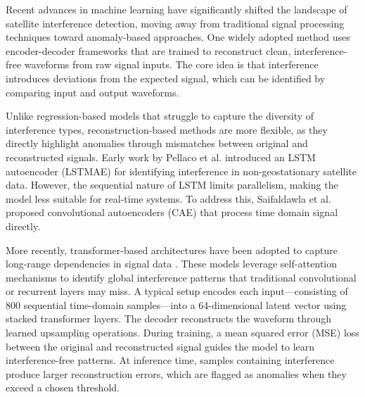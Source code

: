 \documentclass[conference]{IEEEtran}
\begin{document}

Recent advances in machine learning have significantly shifted the landscape of satellite interference detection, moving away from traditional signal processing techniques toward anomaly-based approaches. One widely adopted method uses encoder-decoder frameworks that are trained to reconstruct clean, interference-free waveforms from raw signal inputs. The core idea is that interference introduces deviations from the expected signal, which can be identified by comparing input and output waveforms.

Unlike regression-based models that struggle to capture the diversity of interference types, reconstruction-based methods are more flexible, as they directly highlight anomalies through mismatches between original and reconstructed signals. Early work by Pellaco et al. \cite{pellacoSpectrumPredictionInterference2019} introduced an LSTM autoencoder (LSTMAE) for identifying interference in non-geostationary satellite data. However, the sequential nature of LSTM limits parallelism, making the model less suitable for real-time systems. To address this, Saifaldawla et al. \cite{saifaldawlaConvolutionalAutoencodersNonGeostationary2024} proposed convolutional autoencoders (CAE) that process time domain signal directly.

More recently, transformer-based architectures have been adopted to capture long-range dependencies in signal data \cite{saifaldawlaGenAIBasedModelsNGSO2024}. These models leverage self-attention mechanisms to identify global interference patterns that traditional convolutional or recurrent layers may miss. A typical setup encodes each input—consisting of 800 sequential time-domain samples—into a 64-dimensional latent vector using stacked transformer layers. The decoder reconstructs the waveform through learned upsampling operations. During training, a mean squared error (MSE) loss between the original and reconstructed signal guides the model to learn interference-free patterns. At inference time, samples containing interference produce larger reconstruction errors, which are flagged as anomalies when they exceed a chosen threshold.
\end{document}
